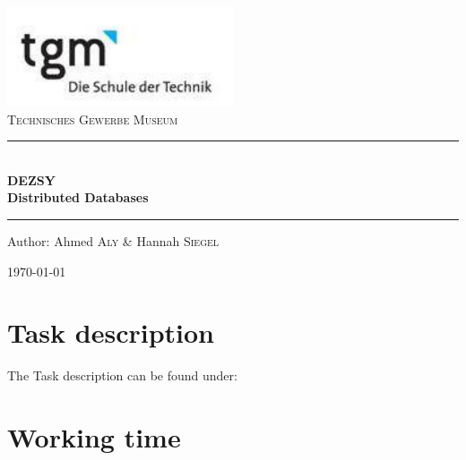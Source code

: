 \documentclass[12pt]{article}
\begin{document}
\begin{titlepage}
\begin{center}
\includegraphics[width=0.5\textwidth]{images/logo}\\[1cm]    

\textsc{\LARGE Technisches Gewerbe Museum}\\[1.5cm]

\rule{12cm}{1mm}
{ \huge \bfseries  \\\large DEZSY\\ \huge Distributed Databases \\[0.4cm] }

\rule{12cm}{1mm}

\noindent 
\vspace{5cm}

\begin{center}
\large
Author: 
Ahmed \textsc{Aly} \&
Hannah \textsc{Siegel}
\end{center}

\vfill

{\large \today}

\end{center}
\end{titlepage}

\tableofcontents

\newpage

\section{Task description}
\label{sec:aufgabenstellung}
The Task description can be found under:

\section{Working time}
\end{document}
